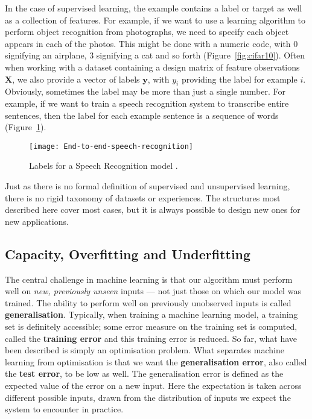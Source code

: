 In the case of supervised learning, the example contains a label or target as
well as a collection of features. For example, if we want to use a learning
algorithm to perform object recognition from photographs, we need to specify
each object appears in each of the photos. This might be done with a numeric
code, with 0 signifying an airplane, 3 signifying a cat and so forth
(Figure~\ref{fig:cifar10}). Often when working with a dataset containing a
design matrix of feature observations $\boldsymbol{X}$, we also provide a
vector of labels $\boldsymbol{y}$, with $y_i$ providing the label for
example $i$. Obviously, sometimes the label may be more than just a single
number. For example, if we want to train a speech recognition system to
transcribe entire sentences, then the label for each example sentence is a
sequence of words (Figure~\ref{fig:end2end_speech}).
\begin{figure}[h]
    \centering
    \texttt{[image: End-to-end-speech-recognition]}
    \caption{Labels for a Speech Recognition model \cite{end2end_intel_ai}.}
    \label{fig:end2end_speech}
\end{figure}


Just as there is no formal definition of supervised and unsupervised learning,
there is no rigid taxonomy of datasets or experiences. The structures most
described here cover most cases, but it is always possible to design new ones
for new applications.

\subsection{Capacity, Overfitting and Underfitting}
The central challenge in machine learning is that our algorithm must perform
well on \emph{new, previously unseen} inputs --- not just those on which our
model was trained. The ability to perform well on previously unobserved inputs
is called \textbf{generalisation}. Typically, when training a machine learning
model, a training set is definitely accessible; some error measure on the
training set is computed, called the \textbf{training error} and this training
error is reduced. So far, what have been described is simply an optimisation
problem. What separates machine learning from optimisation is that we want the
\textbf{generalisation error}, also called the \textbf{test error}, to be low
as well. The generalisation error is defined as the expected value of the error
on a new input. Here the expectation is taken across different possible inputs,
drawn from the distribution of inputs we expect the system to encounter in
practice.


